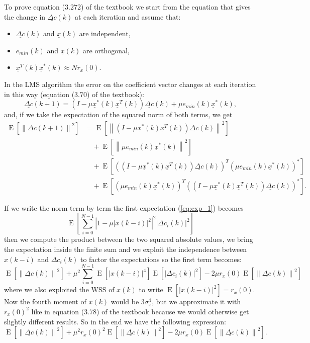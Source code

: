 \documentclass[a4paper,oneside]{article}
\renewcommand{\vec}[1]{\underline{#1}}
\newcommand{\E}[1]{\operatorname{E}\left[#1\right]}
\newcommand{\norm}[1]{\left\lVert#1\right\rVert}
\newcommand{\abs}[1]{\left|#1\right|}
\begin{document}
To prove equation (3.272) of the textbook we start from the equation
that gives the change in $\vec{\Delta c}(k)$ at each iteration and
assume that:
\begin{itemize}
\item $\vec{\Delta c}(k)$ and $\vec{x}(k)$ are independent, 
\item $e_{min}(k)$ and $\vec{x}(k)$ are orthogonal, 
\item $\vec{x}^T(k)\vec{x}^*(k) \approx Nr_x(0)$.
\end{itemize}
In the LMS algorithm the error on the coefficient vector changes at each iteration in this way (equation (3.70) of the textbook):
\begin{equation*}
  \vec{\Delta c}(k+1) = \left( I - \mu\vec{x}^*(k)\vec{x}^T(k) \right) \vec{\Delta c}(k) + \mu e_{min}(k)\vec{x}^*(k) , 
\end{equation*}
and, if we take the expectation of the squared norm of both terms, we get
\begin{align}
  \E{\norm{\vec{\Delta c}(k+1)}^2} %
  &= \E{\norm{\left( I - \mu\vec{x}^*(k)\vec{x}^T(k) \right) \vec{\Delta c}(k)}^2}
  \label{eq:exp_1} \\
  & \quad + \E{\norm{\mu e_{min}(k)\vec{x}^*(k)}^2}
  \label{eq:exp_2} \\
  & \quad + \E{\left(\left( I - \mu\vec{x}^*(k)\vec{x}^T(k) \right)\vec{\Delta c}(k)\right)^T\left(\mu e_{min}(k)\vec{x}^*(k)\right)^*}
  \label{eq:exp_3} \\
  & \quad + \E{\left(\mu e_{min}(k)\vec{x}^*(k)\right)^T\left(\left( I - \mu\vec{x}^*(k) \vec{x}^T(k)\right) \vec{\Delta c}(k)\right)^*}
  \label{eq:exp_4} .
\end{align}

If we write the norm term by term the first expectation
(\ref{eq:exp_1}) becomes
\[ \E{\sum_{i=0}^{N-1}\abs{1 - \mu\abs{x(k-i)}^2}^2\abs{\Delta c_i(k)}^2} \]
then we compute the product between the two squared absolute values,
we bring the expectation inside the finite sum and we exploit the
independence between $x(k-i)$ and $\Delta c_i(k)$ to factor the
expectations so the first term becomes:
\[ \E{\norm{\vec{\Delta c}(k)}^2} +
\mu^2\sum_{i=0}^{N-1}\E{\abs{x(k-i)}^4}\E{\abs{\Delta c_i(k)}^2} - 2\mu
r_x(0)\E{\norm{\vec{\Delta c}(k)}^2}
\]
where we also exploited the WSS of $x(k)$ to write $\E{\abs{x(k-i)}^2}
= r_x(0)$. Now the fourth moment of $x(k)$ would be $3\sigma^4_x$, but
we approximate it with $r_x(0)^2$ like in equation (3.78) of the
textbook because we would otherwise get slightly different results.
So in the end we have the following expression:
\begin{equation}
\E{\norm{\vec{\Delta c}(k)}^2} +
\mu^2r_x(0)^2\E{\norm{\vec{\Delta c}(k)}^2} - 2\mu
r_x(0)\E{\norm{\vec{\Delta c}(k)}^2} .
\label{eq:c_final_1}
\end{equation}
\end{document}
